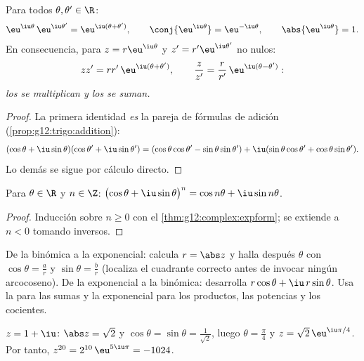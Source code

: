 \begin{theorem}\label{thm:g12:complex:expform}
Para todos $\theta, \theta' \in \R$:
\[
\eu^{\iu\theta}\,\eu^{\iu\theta'} = \eu^{\iu(\theta + \theta')},
\qquad
\conj{\eu^{\iu\theta}} = \eu^{-\iu\theta},
\qquad
\abs{\eu^{\iu\theta}} = 1 .
\]
En consecuencia, para $z = r\eu^{\iu\theta}$ y $z' = r'\eu^{\iu\theta'}$ no
nulos:
\[
zz' = rr'\,\eu^{\iu(\theta+\theta')},
\qquad
\frac{z}{z'} = \frac{r}{r'}\,\eu^{\iu(\theta - \theta')} :
\]
\emph{los  se multiplican y los  se suman.}
\end{theorem}

\begin{proof}
La primera identidad \emph{es} la pareja de fórmulas de adición
(\cref{prop:g12:trigo:addition}):
\[
(\cos\theta + \iu\sin\theta)(\cos\theta' + \iu\sin\theta')
= (\cos\theta\cos\theta' - \sin\theta\sin\theta')
+ \iu(\sin\theta\cos\theta' + \cos\theta\sin\theta').
\]
Lo demás se sigue por cálculo directo.
\end{proof}

\begin{corollary}\label{cor:g12:complex:demoivre}
Para $\theta \in \R$ y $n \in \Z$:
$\bigl(\cos\theta + \iu\sin\theta\bigr)^n = \cos n\theta + \iu \sin n\theta$.
\end{corollary}

\begin{proof}
Inducción sobre $n \geq 0$ con el \cref{thm:g12:complex:expform}; se
extiende a $n < 0$ tomando inversos.
\end{proof}

\begin{method}\label{met:g12:complex:forms}
De la binómica a la exponencial: calcula $r = \abs z$ y halla después
$\theta$ con $\cos\theta = \frac ar$ y $\sin\theta = \frac br$ (localiza el
cuadrante correcto antes de invocar ningún arcocoseno). De la exponencial a
la binómica: desarrolla $r\cos\theta + \iu\, r\sin\theta$. Usa la  para las sumas y la exponencial para los productos, las potencias y
los cocientes.
\end{method}

\begin{example}
$z = 1 + \iu$: $\abs z = \sqrt2$ y
$\cos\theta = \sin\theta = \frac{1}{\sqrt2}$, luego $\theta = \frac\pi4$ y
$z = \sqrt2\,\eu^{\iu\pi/4}$. Por tanto,
$z^{20} = 2^{10}\,\eu^{5\iu\pi} = -1024$.
\end{example}

